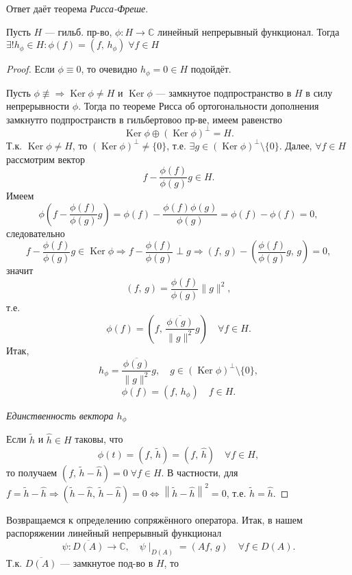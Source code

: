 Ответ даёт теорема \emph{Рисса-Фреше}.
\begin{thm}
Пусть $H$ --- гильб.
пр-во, $\phi : H \to \mathbb{C}$ линейный непрерывный
функционал. Тогда $\exists! h_\phi \in H: \phi(f) =(f,\,h_\phi)
 \; \forall f \in H$
\end{thm}
\begin{proof}
	Если $\phi \equiv 0$, то очевидно $h_\phi=0 \in H$ 
	подойдёт.

	Пусть $\phi \not\equiv \Rightarrow \operatorname{Ker}
	\phi \neq H$ и $\operatorname{Ker} \phi$ --- замкнутое
	подпространство в $H$ в силу непрерывности $\phi$.
	Тогда по теореме Рисса об ортогональности дополнения
	замкнутго подпространств в гильбертовоо пр-ве,
	имеем равенство
	\[
		\operatorname{Ker}\phi \oplus (\operatorname{Ker}\phi)^\perp = H
	.\]
	Т.\:к. $\operatorname{Ker}\phi \neq H$, то 
	$\left( \operatorname{Ker}\phi \right) ^\perp \neq
	\{0\} $, т.\:е. $\exists g \in \left( \operatorname{Ker}\phi \right)^\perp \setminus \{0\}  $.
	Далее, $\forall f \in  H$ рассмотрим вектор
	\[
		f - \frac{\phi(f)}{\phi(g)}g \in H
	.\] 
	Имеем 
	\[
		\phi\left(f - \frac{\phi(f)}{\phi(g)}g\right)=
		\phi(f)- \frac{\phi(f) \phi(g)}{\phi(g)}=
		\phi(f) - \phi(f)=0
	,\]
	следовательно
	\[
		f - \frac{\phi(f)}{\phi(g)}g \in \operatorname{Ker}
		\phi \Rightarrow f - \frac{\phi(f)}{\phi(g)}\perp g
		\Rightarrow (f,\,g) - \left( 
		\frac{\phi(f)}{\phi(g)}g,\,g\right) =0,
	\]
	значит
	\[
		(f,\,g)= \frac{\phi(f)}{\phi(g)}\| g\|^2,
	\]
	т.\:е.
	\[
		\phi(f) = \left( f,\, \frac{\overline{\phi(g)}}{
		\|g \|^2}g \right) \quad \forall f \in H
	.\] 
	Итак,
	\[
		h_\phi= \frac{\overline{\phi(g)}}{\| g\|^2}g,
		\quad g \in \left( \operatorname{Ker}\phi \right) ^\perp \setminus \{0\} 
	,\]
	\[
		\phi(f) = (f,\, h_\phi) \quad f \in H
	.\]

	\emph{Единственность вектора $h_\phi$}
	
	Если $ \tilde{h}$ и $ \hat{h}\in H$ таковы, что
	\[
		\phi(t) =\left(f,\,\tilde{h}\right)=
		\left( f,\, \hat{h} \right) \quad \forall
		f \in H
	,\]
	то        получаем $    \left(f,\,\tilde{h}-\hat{h}\right)=0
	\;          \forall f \in H $. В       частности,
	для $f = \tilde{h}- \hat{h} \Rightarrow 
	 \left( \tilde{h}-\hat{h},\,\tilde{h}-
	 \hat{h}\right)=0 \Leftrightarrow \left\lVert 
  \tilde{h}- \hat{h}\right\rVert^2=0$, т.\:е.  $\tilde{h}=\hat{h}$.
\end{proof}
Возвращаемся к определению сопряжённого оператора.
Итак, в нашем распоряжении линейный непрерывный функционал
\[
	\psi: \overline{D(A)}\to \mathbb{C},
	\quad \psi\mid _{D(A)}= (Af,\,g) \quad \forall
	f \in D(A)
.\] Т.\:к. $\overline{D(A)}$ --- замкнутое под-во в $H$, то

